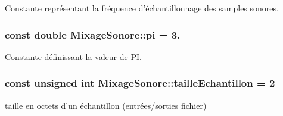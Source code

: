 Constante représentant la fréquence d'échantillonnage des samples sonores. 

\hypertarget{namespaceMixageSonore_a74eacef80ae62303d777e9b6791cd8af}{
\subsubsection[{pi}]{\setlength{\rightskip}{0pt plus 5cm}const double Mixage\-Sonore\-::pi = 3.\hspace{0.3cm}{\ttfamily [static]}}}\label{namespaceMixageSonore_a74eacef80ae62303d777e9b6791cd8af}


Constante définissant la valeur de P\-I. 

\hypertarget{namespaceMixageSonore_a1d6118bf5d0d09e5be4136d50f2ac887}{
\subsubsection[{taille\-Echantillon}]{\setlength{\rightskip}{0pt plus 5cm}const unsigned int Mixage\-Sonore\-::taille\-Echantillon = 2\hspace{0.3cm}{\ttfamily [static]}}}\label{namespaceMixageSonore_a1d6118bf5d0d09e5be4136d50f2ac887}


taille en octets d'un échantillon (entrées/sorties fichier) 

